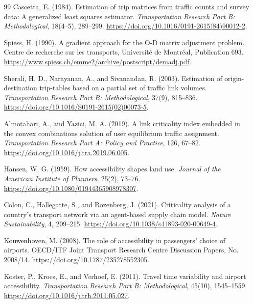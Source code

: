 \documentclass[11pt,a4paper]{article}
\begin{document}
\begin{thebibliography}{99}
Cascetta, E. (1984).
\newblock Estimation of trip matrices from traffic counts and survey data: A
generalized least squares estimator.
\newblock \emph{Transportation Research Part B: Methodological}, 18(4--5),
289--299.
\newblock \url{https://doi.org/10.1016/0191-2615(84)90012-2}.

Spiess, H. (1990).
\newblock A gradient approach for the O-D matrix adjustment problem.
\newblock Centre de recherche sur les transports, Universit{\'e} de Montr{\'e}al,
Publication 693.
\newblock \url{https://www.spiess.ch/emme2/archive/postscript/demadj.pdf}.

Sherali, H. D., Narayanan, A., and Sivanandan, R. (2003).
\newblock Estimation of origin-destination trip-tables based on a partial set
of traffic link volumes.
\newblock \emph{Transportation Research Part B: Methodological}, 37(9),
815--836.
\newblock \url{https://doi.org/10.1016/S0191-2615(02)00073-5}.

Almotahari, A., and Yazici, M. A. (2019).
\newblock A link criticality index embedded in the convex combinations
solution of user equilibrium traffic assignment.
\newblock \emph{Transportation Research Part A: Policy and Practice}, 126,
67--82.
\newblock \url{https://doi.org/10.1016/j.tra.2019.06.005}.

Hansen, W. G. (1959).
\newblock How accessibility shapes land use.
\newblock \emph{Journal of the American Institute of Planners}, 25(2),
73--76.
\newblock \url{https://doi.org/10.1080/01944365908978307}.

Colon, C., Hallegatte, S., and Rozenberg, J. (2021).
\newblock Criticality analysis of a country's transport network via an
agent-based supply chain model.
\newblock \emph{Nature Sustainability}, 4, 209--215.
\newblock \url{https://doi.org/10.1038/s41893-020-00649-4}.

Kouwenhoven, M. (2008).
\newblock The role of accessibility in passengers' choice of airports.
\newblock OECD/ITF Joint Transport Research Centre Discussion Papers,
No. 2008/14.
\newblock \url{https://doi.org/10.1787/235278552305}.

Koster, P., Kroes, E., and Verhoef, E. (2011).
\newblock Travel time variability and airport accessibility.
\newblock \emph{Transportation Research Part B: Methodological}, 45(10),
1545--1559.
\newblock \url{https://doi.org/10.1016/j.trb.2011.05.027}.


\end{thebibliography}
\end{document}
